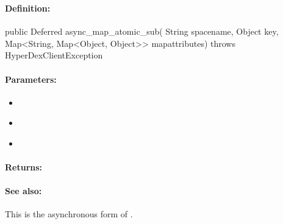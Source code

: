 \pagebreak
\subsubsection{}
\label{api:java:async_map_atomic_sub}


\paragraph{Definition:}
\begin{javacode}
public Deferred async_map_atomic_sub(
        String spacename,
        Object key,
        Map<String, Map<Object, Object>> mapattributes) throws HyperDexClientException
\end{javacode}

\paragraph{Parameters:}
\begin{itemize}[noitemsep]
\item {}\\

\item {}\\

\item {}\\

\end{itemize}

\paragraph{Returns:}


\paragraph{See also:}  This is the asynchronous form of .

\pagebreak
\subsubsection{}
\label{api:java:cond_map_atomic_sub}


